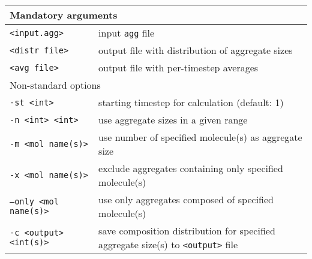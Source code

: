 \noindent
\begin{longtable}{p{}p{}}
  \toprule
  \multicolumn{2}{l}{Mandatory arguments} \\
  \midrule
  \texttt{<input.agg>} & input \texttt{agg} file \\
  \texttt{<distr file>} & output file with distribution of aggregate
    sizes \\
  \texttt{<avg file>} & output file with per-timestep averages \\
  \toprule
  \multicolumn{2}{l}{Non-standard options} \\
  \midrule
  \texttt{-st <int>} & starting timestep for calculation (default: 1) \\
  \texttt{-n <int> <int>} & use aggregate sizes in a given range \\
  \texttt{-m <mol name(s)>} & use number of specified molecule(s) as
    aggregate size \\
  \texttt{-x <mol name(s)>} & exclude aggregates containing only specified
    mole\-cule(s) \\
  \texttt{--only <mol name(s)>} & use only aggregates composed of specified
    molecule(s) \\
  \texttt{-c <output> <int(s)>} & save composition distribution for
    specified aggregate size(s) to \texttt{<output>} file \\
  \bottomrule
\end{longtable}

